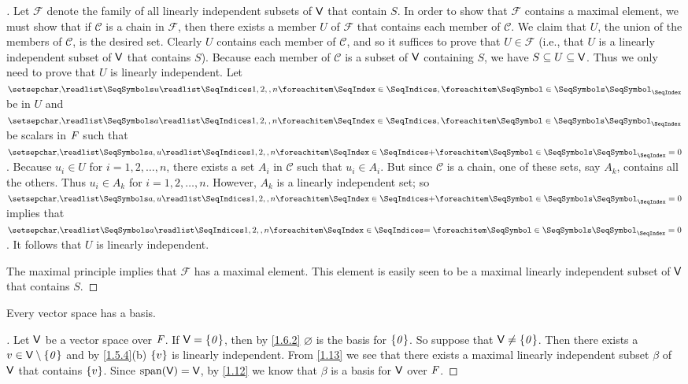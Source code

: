 \begin{proof}[]
  Let \(\mathcal{F}\) denote the family of all linearly independent subsets of \(\mathsf{V}\) that contain \(S\).
  In order to show that \(\mathcal{F}\) contains a maximal element, we must show that if \(\mathcal{C}\) is a chain in \(\mathcal{F}\), then there exists a member \(U\) of \(\mathcal{F}\) that contains each member of \(\mathcal{C}\).
  We claim that \(U\), the union of the members of \(\mathcal{C}\), is the desired set.
  Clearly \(U\) contains each member of \(\mathcal{C}\), and so it suffices to prove that \(U \in \mathcal{F}\)
  (i.e., that \(U\) is a linearly independent subset of \(\mathsf{V}\) that contains \(S\)).
  Because each member of \(\mathcal{C}\) is a subset of \(\mathsf{V}\) containing \(S\), we have \(S \subseteq U \subseteq \mathsf{V}\).
  Thus we only need to prove that \(U\) is linearly independent.
  Let \(\seq{u}{1,2,,n}\) be in \(U\) and \(\seq{a}{1,2,,n}\) be scalars in \(\mathit{F}\) such that \(\seq[+]{a,u}{1,2,,n} = 0\).
  Because \(u_i \in U\) for \(i = 1, 2, \dots, n\), there exists a set \(A_i\) in \(\mathcal{C}\) such that \(u_i \in A_i\).
  But since \(\mathcal{C}\) is a chain, one of these sets, say \(A_k\), contains all the others.
  Thus \(u_i \in A_k\) for \(i = 1, 2, \dots, n\).
  However, \(A_k\) is a linearly independent set;
  so \(\seq[+]{a,u}{1,2,,n} = 0\) implies that \(\seq[=]{a}{1,2,,n} = 0\).
  It follows that \(U\) is linearly independent.

  The maximal principle implies that \(\mathcal{F}\) has a maximal element.
  This element is easily seen to be a maximal linearly independent subset of \(\mathsf{V}\) that contains \(S\).
\end{proof}

\begin{cor}\label{1.7.10}
  Every vector space has a basis.
\end{cor}

\begin{proof}[]
  Let \(\mathsf{V}\) be a vector space over \(\mathit{F}\).
  If \(\mathsf{V} = \left\lbrace\mathit{0}\right\rbrace\), then by \cref{1.6.2} \(\varnothing\) is the basis for \(\left\lbrace\mathit{0}\right\rbrace\).
  So suppose that \(\mathsf{V} \neq \left\lbrace\mathit{0}\right\rbrace\).
  Then there exists a \(v \in \mathsf{V} \setminus \left\lbrace\mathit{0}\right\rbrace\) and by \cref{1.5.4}(b) \(\left\lbrace v\right\rbrace\) is linearly independent.
  From \cref{1.13} we see that there exists a maximal linearly independent subset \(\beta\) of \(\mathsf{V}\) that contains \(\left\lbrace v\right\rbrace\).
  Since \(\spn{\V} = \V\), by \cref{1.12} we know that \(\beta\) is a basis for \(\mathsf{V}\) over \(\mathit{F}\).
\end{proof}

